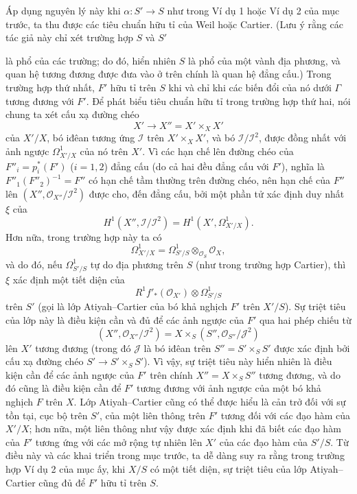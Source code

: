 \documentclass[11pt,twoside,openany]{book}
\numberwithin{equation}{section}
\newcommand{\src}[1]{%
  \phantomsection\hypertarget{src:\fgasourceid:#1}{}%
  \marginpar{\raggedleft\footnotesize\sffamily #1}%
}
\newcommand{\fgasourceid}{unset}
\begin{document}
Áp dụng nguyên lý này khi $\alpha:S'\longrightarrow S$ như trong Ví dụ 1 hoặc
Ví dụ 2 của mục trước, ta thu được các tiêu chuẩn hữu tỉ của Weil hoặc Cartier.
(Lưu ý rằng các tác giả này chỉ xét trường hợp $S$ và $S'$

\src{323}
là phổ của các trường; do đó, hiển nhiên $S$ là phổ của một vành địa phương,
và quan hệ tương đương được đưa vào ở trên chính là quan hệ đẳng cấu.) Trong
trường hợp thứ nhất, $F'$ hữu tỉ trên $S$ khi và chỉ khi các biến đổi của nó
dưới $\Gamma$ tương đương với $F'$. Để phát biểu tiêu chuẩn hữu tỉ trong trường
hợp thứ hai, nói chung ta xét cấu xạ đường chéo
\[
  X'\longrightarrow X''=X'\times_XX'
\]
của $X'/X$, bó iđêan tương ứng $\mathcal I$ trên $X'\times_XX'$, và bó
$\mathcal I/\mathcal I^2$, được đồng nhất với ảnh ngược
$\Omega^1_{X'/X}$ của nó trên $X'$. Vì các hạn chế lên đường chéo của
$F''_i=p_i^*(F')$ ($i=1,2$) đẳng cấu (do cả hai đều đẳng cấu với $F'$), nghĩa
là $F''_1(F''_2)^{-1}=F''$ có hạn chế tầm thường trên đường chéo, nên hạn chế
của $F''$ lên $(X'',\mathcal O_{X''}/\mathcal I^2)$ được cho, đến đẳng cấu,
bởi một phần tử xác định duy nhất $\xi$ của
\[
  H^1(X'',\mathcal I/\mathcal I^2)
  =H^1(X',\Omega^1_{X'/X}).
\]
Hơn nữa, trong trường hợp này ta có
\[
  \Omega^1_{X'/X}
  =\Omega^1_{S'/S}\otimes_{\mathcal O_S}\mathcal O_X,
\]
và do đó, nếu $\Omega^1_{S'/S}$ tự do địa phương trên $S$ (như trong trường
hợp Cartier), thì $\xi$ xác định một tiết diện của
\[
  R^1f'_*(\mathcal O_{X'})\otimes\Omega^1_{S'/S}
\]
trên $S'$ (gọi là lớp Atiyah--Cartier của bó khả nghịch $F'$ trên $X'/S$).
Sự triệt tiêu của lớp này là điều kiện cần và đủ để các ảnh ngược của $F'$ qua
hai phép chiếu từ
\[
  (X'',\mathcal O_{X''}/\mathcal I^2)
  =X\times_S(S'',\mathcal O_{S''}/\mathcal J^2)
\]
lên $X'$ tương đương (trong đó $\mathcal J$ là bó iđêan trên
$S''=S'\times_SS'$ được xác định bởi cấu xạ đường chéo
$S'\longrightarrow S'\times_SS'$). Vì vậy, sự triệt tiêu này hiển nhiên là
điều kiện cần để các ảnh ngược của $F'$ trên chính
$X''=X\times_SS''$ tương đương, và do đó cũng là điều kiện cần để $F'$ tương
đương với ảnh ngược của một bó khả nghịch $F$ trên $X$. Lớp Atiyah--Cartier
cũng có thể được hiểu là cản trở đối với sự tồn tại, cục bộ trên $S'$, của một
liên thông trên $F'$ tương đối với các đạo hàm của $X'/X$; hơn nữa, một liên
thông như vậy được xác định khi đã biết các đạo hàm của $F'$ tương ứng với các
mở rộng tự nhiên lên $X'$ của các đạo hàm của $S'/S$. Từ điều này và các khai
triển trong mục trước, ta dễ dàng suy ra rằng trong trường hợp Ví dụ 2 của mục
ấy, khi $X/S$ có một tiết diện, sự triệt tiêu của lớp Atiyah--Cartier cũng đủ
để $F'$ hữu tỉ trên $S$.
\end{document}
